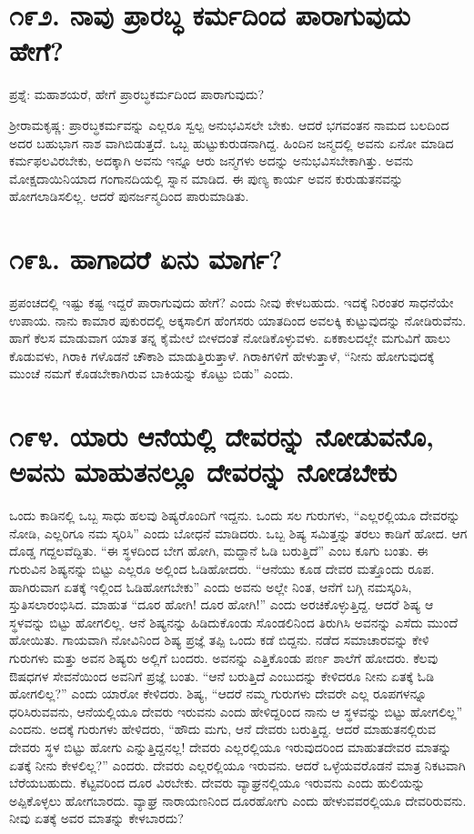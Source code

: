 \section{\num{೧೯೨. } ನಾವು ಪ್ರಾರಬ್ಧ ಕರ್ಮದಿಂದ ಪಾರಾಗುವುದು ಹೇಗೆ?}

ಪ್ರಶ್ನೆ: ಮಹಾಶಯರೆ, ಹೇಗೆ ಪ್ರಾರಬ್ಧಕರ್ಮದಿಂದ ಪಾರಾಗುವುದು?

ಶ್ರೀರಾಮಕೃಷ್ಣ: ಪ್ರಾರಬ್ಧಕರ್ಮವನ್ನು ಎಲ್ಲರೂ ಸ್ವಲ್ಪ ಅನುಭವಿಸಲೇ ಬೇಕು. ಆದರೆ ಭಗವಂತನ ನಾಮದ ಬಲದಿಂದ ಅದರ ಬಹುಭಾಗ ನಾಶ ವಾಗಿಬಿಡುತ್ತದೆ. ಒಬ್ಬ ಹುಟ್ಟುಕುರುಡನಾಗಿದ್ದ. ಹಿಂದಿನ ಜನ್ಮದಲ್ಲಿ ಅವನು ಏನೋ ಮಾಡಿದ ಕರ್ಮಫಲವಿರಬೇಕು, ಅದಕ್ಕಾಗಿ ಅವನು ಇನ್ನೂ ಆರು ಜನ್ಮಗಳು ಅದನ್ನು ಅನುಭವಿಸಬೇಕಾಗಿತ್ತು. ಅವನು ಮೋಕ್ಷದಾಯಿನಿಯಾದ ಗಂಗಾನದಿಯಲ್ಲಿ ಸ್ನಾನ ಮಾಡಿದ. ಈ ಪುಣ್ಯ ಕಾರ್ಯ ಅವನ ಕುರುಡುತನವನ್ನು ಹೋಗಲಾಡಿಸಲಿಲ್ಲ. ಆದರೆ ಪುನರ್ಜನ್ಮದಿಂದ ಪಾರುಮಾಡಿತು.


\section{\num{೧೯೩. } ಹಾಗಾದರೆ ಏನು ಮಾರ್ಗ?}

ಪ್ರಪಂಚದಲ್ಲಿ ಇಷ್ಟು ಕಷ್ಟ ಇದ್ದರೆ ಪಾರಾಗುವುದು ಹೇಗೆ? ಎಂದು ನೀವು ಕೇಳಬಹುದು. ಇದಕ್ಕೆ ನಿರಂತರ ಸಾಧನೆಯೇ ಉಪಾಯ. ನಾನು ಕಾಮಾರ ಪುಕುರದಲ್ಲಿ ಅಕ್ಕಸಾಲಿಗ ಹೆಂಗಸರು ಯಾತದಿಂದ ಅವಲಕ್ಕಿ ಕುಟ್ಟುವುದನ್ನು ನೋಡಿರುವೆನು. ಹಾಗೆ ಕೆಲಸ ಮಾಡುವಾಗ ಯಾತ ತನ್ನ ಕೈಮೇಲೆ ಬೀಳದಂತೆ ನೋಡಿಕೊಳ್ಳುವಳು. ಏಕಕಾಲದಲ್ಲೇ ಮಗುವಿಗೆ ಹಾಲು ಕೊಡುವಳು, ಗಿರಾಕಿ ಗಳೊಡನೆ ಚೌಕಾಶಿ ಮಾಡುತ್ತಿರುತ್ತಾಳೆ. ಗಿರಾಕಿಗಳಿಗೆ ಹೇಳುತ್ತಾಳೆ, “ನೀನು ಹೋಗುವುದಕ್ಕೆ ಮುಂಚೆ ನಮಗೆ ಕೊಡಬೇಕಾಗಿರುವ ಬಾಕಿಯನ್ನು ಕೊಟ್ಟು ಬಿಡು” ಎಂದು.


\section{\num{೧೯೪. } ಯಾರು ಆನೆಯಲ್ಲಿ ದೇವರನ್ನು ನೋಡುವನೊ, ಅವನು ಮಾಹುತನಲ್ಲೂ ದೇವರನ್ನು ನೋಡಬೇಕು }

ಒಂದು ಕಾಡಿನಲ್ಲಿ ಒಬ್ಬ ಸಾಧು ಹಲವು ಶಿಷ್ಯರೊಂದಿಗೆ ಇದ್ದನು. ಒಂದು ಸಲ ಗುರುಗಳು, “ಎಲ್ಲರಲ್ಲಿಯೂ ದೇವರನ್ನು ನೋಡಿ, ಎಲ್ಲರಿಗೂ ನಮ ಸ್ಕರಿಸಿ” ಎಂದು ಬೋಧನೆ ಮಾಡಿದರು. ಒಬ್ಬ ಶಿಷ್ಯ ಸಮಿತ್ತನ್ನು ತರಲು ಕಾಡಿಗೆ ಹೋದ. ಆಗ ದೊಡ್ಡ ಗದ್ದಲವೆದ್ದಿತು. “ಈ ಸ್ಥಳದಿಂದ ಬೇಗ ಹೋಗಿ, ಮದ್ದಾನೆ ಓಡಿ ಬರುತ್ತಿದೆ” ಎಂಬ ಕೂಗು ಬಂತು. ಈ ಗುರುವಿನ ಶಿಷ್ಯನನ್ನು ಬಿಟ್ಟು ಎಲ್ಲರೂ ಅಲ್ಲಿಂದ ಓಡಿಹೋದರು. “ಆನೆಯು ಕೂಡ ದೇವರ ಮತ್ತೊಂದು ರೂಪ. ಹಾಗಿರುವಾಗ ಏತಕ್ಕೆ ಇಲ್ಲಿಂದ ಓಡಿಹೋಗಬೇಕು” ಎಂದು ಅವನು ಅಲ್ಲೇ ನಿಂತ, ಆನೆಗೆ ಬಗ್ಗಿ ನಮಸ್ಕರಿಸಿ, ಸ್ತುತಿಸಲಾರಂಭಿಸಿದ. ಮಾಹುತ “ದೂರ ಹೋಗಿ! ದೂರ ಹೋಗಿ!” ಎಂದು ಅರಚಿಕೊಳ್ಳುತ್ತಿದ್ದ. ಆದರೆ ಶಿಷ್ಯ ಆ ಸ್ಥಳವನ್ನು ಬಿಟ್ಟು ಹೋಗಲಿಲ್ಲ. ಆನೆ ಶಿಷ್ಯನನ್ನು ಹಿಡಿದುಕೊಂಡು ಸೊಂಡಲಿನಿಂದ ತಿರುಗಿಸಿ ಅವನನ್ನು ಎಸೆದು ಮುಂದೆ ಹೋಯಿತು. ಗಾಯವಾಗಿ ನೋವಿನಿಂದ ಶಿಷ್ಯ ಪ್ರಜ್ಞೆ ತಪ್ಪಿ ಒಂದು ಕಡೆ ಬಿದ್ದನು. ನಡೆದ ಸಮಾಚಾರವನ್ನು ಕೇಳಿ ಗುರುಗಳು ಮತ್ತು ಅವನ ಶಿಷ್ಯರು ಅಲ್ಲಿಗೆ ಬಂದರು. ಅವನನ್ನು ಎತ್ತಿಕೊಂಡು ಪರ್ಣ ಶಾಲೆಗೆ ಹೋದರು. ಕೆಲವು ಔಷಧಗಳ ಸೇವನೆಯಿಂದ ಅವನಿಗೆ ಪ್ರಜ್ಞೆ ಬಂತು. “ಆನೆ ಬರುತ್ತಿದೆ ಎಂಬುದನ್ನು ಕೇಳಿದರೂ ನೀನು ಏತಕ್ಕೆ ಓಡಿ ಹೋಗಲಿಲ್ಲ?” ಎಂದು ಯಾರೋ ಕೇಳಿದರು. ಶಿಷ್ಯ, “ಆದರೆ ನಮ್ಮ ಗುರುಗಳು ದೇವರೇ ಎಲ್ಲ ರೂಪಗಳನ್ನೂ ಧರಿಸಿರುವವನು, ಆನೆಯಲ್ಲಿಯೂ ದೇವರು ಇರುವನು ಎಂದು ಹೇಳಿದ್ದರಿಂದ ನಾನು ಆ ಸ್ಥಳವನ್ನು ಬಿಟ್ಟು ಹೋಗಲಿಲ್ಲ” ಎಂದನು. ಅದಕ್ಕೆ ಗುರುಗಳು ಹೇಳಿದರು, “ಹೌದು ಮಗು, ಆನೆ ದೇವರು ಬರುತ್ತಿದ್ದ. ಆದರೆ ಮಾಹುತನಲ್ಲಿರುವ ದೇವರು ಸ್ಥಳ ಬಿಟ್ಟು ಹೋಗು ಎನ್ನುತ್ತಿದ್ದನಲ್ಲ! ದೇವರು ಎಲ್ಲರಲ್ಲಿಯೂ ಇರುವುದರಿಂದ ಮಾಹುತದೇವರ ಮಾತನ್ನು ಏತಕ್ಕೆ ನೀನು ಕೇಳಲಿಲ್ಲ?” ಎಂದರು. ದೇವರು ಎಲ್ಲರಲ್ಲಿಯೂ ಇರುವನು. ಆದರೆ ಒಳ್ಳೆಯವರೊಡನೆ ಮಾತ್ರ ನಿಕಟವಾಗಿ ಬೆರೆಯಬಹುದು. ಕೆಟ್ಟವರಿಂದ ದೂರ ವಿರಬೇಕು. ದೇವರು ವ್ಯಾಘ್ರನಲ್ಲಿಯೂ ಇರುವನು ಎಂದು ಹುಲಿಯನ್ನು ಅಪ್ಪಿಕೊಳ್ಳಲು ಹೋಗಬಾರದು. ವ್ಯಾಘ್ರ ನಾರಾಯಣನಿಂದ ದೂರಹೋಗು ಎಂದು ಹೇಳುವವರಲ್ಲಿಯೂ ದೇವರಿರುವನು. ನೀವು ಏತಕ್ಕೆ ಅವರ ಮಾತನ್ನು ಕೇಳಬಾರದು?

